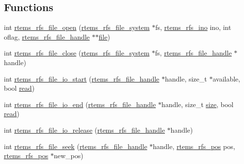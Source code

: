 \subsection*{Functions}
\begin{DoxyCompactItemize}
\item 
int \mbox{\hyperlink{rtems-rfs-file_8c_ab990090bd65f8fcbd5941f20a5db4ada}{rtems\+\_\+rfs\+\_\+file\+\_\+open}} (\mbox{\hyperlink{struct__rtems__rfs__file__system}{rtems\+\_\+rfs\+\_\+file\+\_\+system}} $\ast$fs, \mbox{\hyperlink{rtems-rfs-inode_8h_ae658325c3ff9941f2e68315d20e3c723}{rtems\+\_\+rfs\+\_\+ino}} ino, int oflag, \mbox{\hyperlink{rtems-rfs-file_8h_a35a0f4ad45bd35ea0af7df0aa0ad893b}{rtems\+\_\+rfs\+\_\+file\+\_\+handle}} $\ast$$\ast$\mbox{\hyperlink{structfile}{file}})
\item 
int \mbox{\hyperlink{rtems-rfs-file_8c_a41fc4f3d47394892b567a5e1d0dd35a6}{rtems\+\_\+rfs\+\_\+file\+\_\+close}} (\mbox{\hyperlink{struct__rtems__rfs__file__system}{rtems\+\_\+rfs\+\_\+file\+\_\+system}} $\ast$fs, \mbox{\hyperlink{rtems-rfs-file_8h_a35a0f4ad45bd35ea0af7df0aa0ad893b}{rtems\+\_\+rfs\+\_\+file\+\_\+handle}} $\ast$handle)
\item 
int \mbox{\hyperlink{rtems-rfs-file_8c_a95a9fbf77d3ac355c21ac263db639439}{rtems\+\_\+rfs\+\_\+file\+\_\+io\+\_\+start}} (\mbox{\hyperlink{rtems-rfs-file_8h_a35a0f4ad45bd35ea0af7df0aa0ad893b}{rtems\+\_\+rfs\+\_\+file\+\_\+handle}} $\ast$handle, size\+\_\+t $\ast$available, bool \mbox{\hyperlink{libcsupport_2src_2read_8c_a26d4711c05afec4c7771c3d17b2db9e9}{read}})
\item 
int \mbox{\hyperlink{rtems-rfs-file_8c_ae8539cb85352152dd9b0b5f4a756c092}{rtems\+\_\+rfs\+\_\+file\+\_\+io\+\_\+end}} (\mbox{\hyperlink{rtems-rfs-file_8h_a35a0f4ad45bd35ea0af7df0aa0ad893b}{rtems\+\_\+rfs\+\_\+file\+\_\+handle}} $\ast$handle, size\+\_\+t \mbox{\hyperlink{sun4u_2tte_8h_a245260f6f74972558f61b85227df5aae}{size}}, bool \mbox{\hyperlink{libcsupport_2src_2read_8c_a26d4711c05afec4c7771c3d17b2db9e9}{read}})
\item 
int \mbox{\hyperlink{rtems-rfs-file_8c_a26077ee233df41e872ae47429fb66d40}{rtems\+\_\+rfs\+\_\+file\+\_\+io\+\_\+release}} (\mbox{\hyperlink{rtems-rfs-file_8h_a35a0f4ad45bd35ea0af7df0aa0ad893b}{rtems\+\_\+rfs\+\_\+file\+\_\+handle}} $\ast$handle)
\item 
int \mbox{\hyperlink{rtems-rfs-file_8c_aa6a37c884a77b1399e00425cdf1a864e}{rtems\+\_\+rfs\+\_\+file\+\_\+seek}} (\mbox{\hyperlink{rtems-rfs-file_8h_a35a0f4ad45bd35ea0af7df0aa0ad893b}{rtems\+\_\+rfs\+\_\+file\+\_\+handle}} $\ast$handle, \mbox{\hyperlink{rtems-rfs-file-system_8h_ae6adc04fe673c46403605d64f16699bd}{rtems\+\_\+rfs\+\_\+pos}} pos, \mbox{\hyperlink{rtems-rfs-file-system_8h_ae6adc04fe673c46403605d64f16699bd}{rtems\+\_\+rfs\+\_\+pos}} $\ast$new\+\_\+pos)
$$
\end{DoxyCompactItemize}
